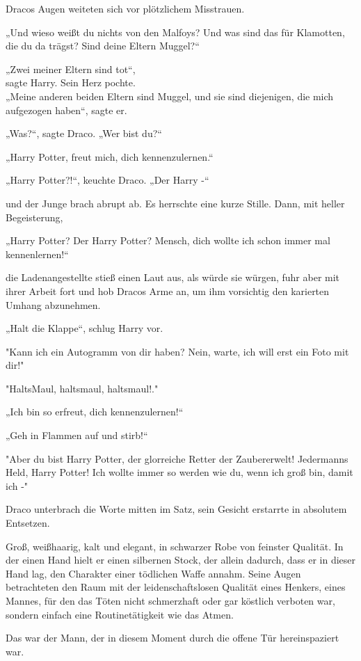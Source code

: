 {Dracos Augen weiteten sich vor plötzlichem Misstrauen.

„Und wieso weißt du nichts von den Malfoys? Und was sind das für Klamotten, die du da trägst? Sind deine Eltern Muggel?“

„Zwei meiner Eltern sind tot“,\\ sagte Harry. Sein Herz pochte.\\ „Meine anderen beiden Eltern sind Muggel, und sie sind diejenigen, die mich aufgezogen haben“, sagte er.

„Was?“, sagte Draco. „Wer bist du?“

„Harry Potter, freut mich, dich kennenzulernen.“

„Harry Potter?!“, keuchte Draco. „Der Harry -“

und der Junge brach abrupt ab. Es herrschte eine kurze Stille. Dann, mit heller Begeisterung,

„Harry Potter? Der Harry Potter? Mensch, dich wollte ich schon immer mal kennenlernen!“

die Ladenangestellte stieß einen Laut aus, als würde sie würgen, fuhr aber mit ihrer Arbeit fort und hob Dracos Arme an, um ihm vorsichtig den karierten Umhang abzunehmen.

„Halt die Klappe“, schlug Harry vor.

"Kann ich ein Autogramm von dir haben? Nein, warte, ich will erst ein Foto mit dir!"

"HaltsMaul, haltsmaul, haltsmaul!."

„Ich bin so erfreut, dich kennenzulernen!“

„Geh in Flammen auf und stirb!“

"Aber du bist Harry Potter, der glorreiche Retter der Zaubererwelt! Jedermanns Held, Harry Potter! Ich wollte immer so werden wie du, wenn ich groß bin, damit ich -"

Draco unterbrach die Worte mitten im Satz, sein Gesicht erstarrte in absolutem Entsetzen.

Groß, weißhaarig, kalt und elegant, in schwarzer Robe von feinster Qualität. In der einen Hand hielt er einen silbernen Stock, der allein dadurch, dass er in dieser Hand lag, den Charakter einer tödlichen Waffe annahm. Seine Augen betrachteten den Raum mit der leidenschaftslosen Qualität eines Henkers, eines Mannes, für den das Töten nicht schmerzhaft oder gar köstlich verboten war, sondern einfach eine Routinetätigkeit wie das Atmen.

Das war der Mann, der in diesem Moment durch die offene Tür hereinspaziert war.

}

